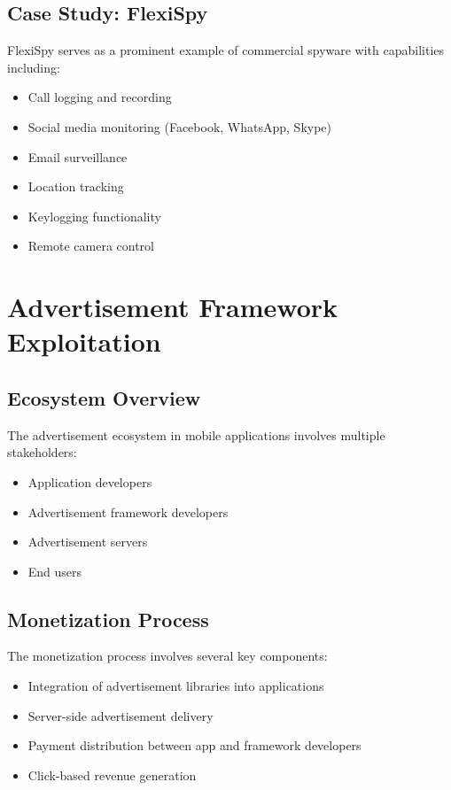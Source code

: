 \documentclass{article}
\begin{document}
\subsection{Case Study: FlexiSpy}
FlexiSpy serves as a prominent example of commercial spyware with capabilities including:
\begin{itemize}
    \item Call logging and recording
    \item Social media monitoring (Facebook, WhatsApp, Skype)
    \item Email surveillance
    \item Location tracking
    \item Keylogging functionality
    \item Remote camera control
\end{itemize}

\section{Advertisement Framework Exploitation}
\subsection{Ecosystem Overview}
The advertisement ecosystem in mobile applications involves multiple stakeholders:
\begin{itemize}
    \item Application developers
    \item Advertisement framework developers
    \item Advertisement servers
    \item End users
\end{itemize}

\subsection{Monetization Process}
The monetization process involves several key components:
\begin{itemize}
    \item Integration of advertisement libraries into applications
    \item Server-side advertisement delivery
    \item Payment distribution between app and framework developers
    \item Click-based revenue generation
\end{itemize}
\end{document}
